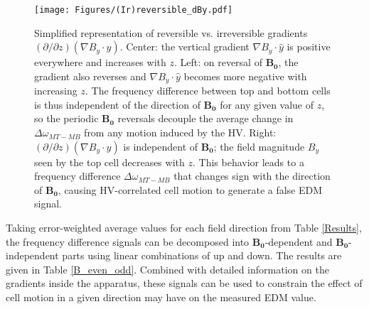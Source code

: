 \documentclass [10pt, twoside] {uwthesis}[2012/04/02]
\begin{document}
\begin{figure}
\begin{center}
\texttt{[image: Figures/(Ir)reversible\_dBy.pdf]}
\end{center}
\caption[Diagram of reversible vs. irreversible vertical field gradients]
{\narrower Simplified representation of reversible vs. irreversible gradients $(\partial/\partial z)(\nabla B_y\cdot\hat{y})$. Center: the vertical gradient $\nabla B_y\cdot\hat{y}$ is positive everywhere and increases with $z$. Left: on reversal of $\mathbf{B_0}$, the gradient also reverses and $\nabla B_y\cdot\hat{y}$ becomes more negative with increasing $z$. The frequency difference between top and bottom cells is thus independent of the direction of $\mathbf{B_0}$ for any given value of $z$, so the periodic $\mathbf{B_0}$ reversals decouple the average change in $\Delta\omega_{MT-MB}$ from any motion induced by the HV. Right: $(\partial/\partial z)(\nabla B_y\cdot\hat{y})$ is independent of $\mathbf{B_0}$; the field magnitude $B_y$ seen by the top cell decreases with $z$. This behavior leads to a frequency difference $\Delta\omega_{MT-MB}$ that changes sign with the direction of $\mathbf{B_0}$, causing HV-correlated cell motion to generate a false EDM signal.}
\label{Reversible_dBy}
\end{figure}

Taking error-weighted average values for each field direction from Table \ref{Results}, the frequency difference signals can be decomposed into $\mathbf{B_0}$-dependent and $\mathbf{B_0}$-independent parts using linear combinations of up and down. The results are given in Table \ref{B_even_odd}. Combined with detailed information on the gradients inside the apparatus, these signals can be used to constrain the effect of cell motion in a given direction may have on the measured EDM value.
\end{document}
